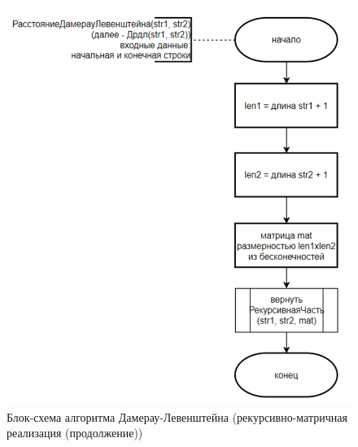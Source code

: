 \begin{figure}[H]
    \centering
    \includegraphics[width=1\textwidth]{img/block_2_3_2.png}
    \caption{Блок-схема алгоритма Дамерау-Левенштейна (рекурсивно-матричная\\ реализация (продолжение))}
\end{figure}
\newpage